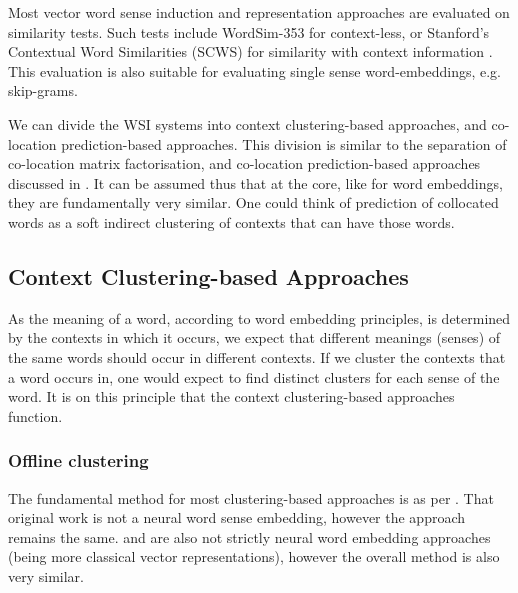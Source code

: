 {

Most vector word sense induction and representation approaches are evaluated on similarity tests.
Such tests include WordSim-353 \parencite{WordSim353} for context-less, or Stanford's Contextual Word Similarities (SCWS) for similarity with context information \parencite{Huang2012}.
This evaluation is also suitable for evaluating single sense word-embeddings, e.g. skip-grams.


We can divide the WSI systems into context clustering-based approaches,
and co-location prediction-based approaches.
This division is similar to the separation of co-location matrix factorisation,
and co-location prediction-based approaches discussed in .
It can be assumed thus that at the core, like for word embeddings,
they are fundamentally very similar.
One could think of prediction of collocated words as a soft indirect clustering of contexts that can have those words.


\subsection{Context Clustering-based Approaches}
As the meaning of a word, according to word embedding principles, is determined by the contexts in which it occurs,
we expect that different meanings (senses) of the same words should occur in different contexts.
If we cluster the contexts that a word occurs in, one would expect to find distinct clusters for each sense of the word.
It is on this principle that the context clustering-based approaches function.



\subsubsection{Offline clustering}\label{sec:offline-clustering}
The fundamental method for most clustering-based approaches is as per .
That original work is not a neural word sense embedding, however the approach remains the same.
 and  are also not strictly neural word embedding approaches (being more classical vector representations), however the overall method is also very similar.


}
